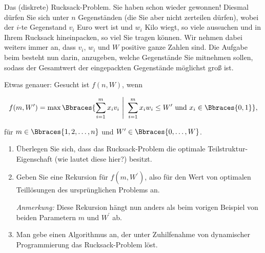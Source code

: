 
\begin{exercise}

Das (diskrete) Rucksack-Problem.
Sie haben schon wieder gewonnen!
Diesmal dürfen Sie sich unter $n$ Gegenständen (die Sie aber nicht zerteilen dürfen), wobei der $i$-te Gegenstand $v_i$ Euro wert ist und $w_i$ Kilo wiegt, so viele aussuchen und in Ihrem Rucksack hineinpacken, so viel Sie tragen können.
Wir nehmen dabei weiters immer an, dass $v_i$, $w_i$ und $W$ positive ganze Zahlen sind.
Die Aufgabe beim  besteht nun darin, anzugeben, welche Gegenstände Sie mitnehmen sollen, sodass der Gesamtwert der eingepackten Gegenstände möglichst groß ist.

Etwas genauer:
Gesucht ist $f(n, W)$, wenn

\begin{align*}
  f(m, W^\prime)
  =
  \max
  \Bbraces
  {
    \sum_{i=1}^m
      x_i v_i
    ~\Bigg |~
    \sum_{i=1}^m
      x_i w_i
    \leq
    W^\prime
    ~\text{und}~
    x_i \in \Bbraces{0, 1}
  },
\end{align*}

für $m \in \Bbraces{1, 2, \dots, n}$ und $W^\prime \in \Bbraces{0, \dots, W}$.

\begin{enumerate}[label = \alph*]

  \item Überlegen Sie sich, dass das Rucksack-Problem die optimale Teilstruktur-Eigenschaft (wie lautet diese hier?) besitzt.

  \item Geben Sie eine Rekursion für $f(m, W^\prime)$, also für den Wert von optimalen Teillösungen des ursprünglichen Problems an.

  \textit{Anmerkung:}
  Diese Rekursion hängt nun anders als beim vorigen Beispiel von beiden Parametern $m$ und $W^\prime$ ab.

  \item Man gebe einen Algorithmus an, der unter Zuhilfenahme von dynamischer Programmierung das Rucksack-Problem löst.

\end{enumerate}

\end{exercise}



